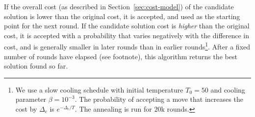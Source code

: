 If the overall cost (as described in Section~\ref{sec:cost-model})
of the candidate solution is lower than the original cost, it is accepted, and used as the starting point for the next round.
If the candidate solution cost is {\em higher} than the original cost, it is accepted with a probability that varies negatively with the difference in cost, and is generally smaller in later rounds than in earlier rounds\footnote{We use a slow cooling schedule with initial temperature $T_0=50$ and cooling parameter $\beta=10^{-3}$. The probability of accepting a move that increases the cost by $\Delta_c$ is $e^{-\Delta_c/T}$. The annealing is run for $20$k rounds.}.
After a fixed number of rounds have elapsed (see footnote), this algorithm returns the best solution found so far.

